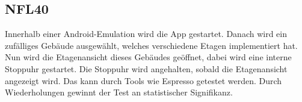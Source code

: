 \subsection*{NFL40}

Innerhalb einer Android-Emulation wird die App gestartet.
Danach wird ein zufälliges Gebäude ausgewählt, welches verschiedene Etagen implementiert hat.
Nun wird die Etagenansicht dieses Gebäudes geöffnet, dabei wird eine interne Stoppuhr gestartet.
Die Stoppuhr wird angehalten, sobald die Etagenansicht angezeigt wird.
Das kann durch Tools wie Espresso getestet werden.
Durch Wiederholungen gewinnt der Test an statistischer Signifikanz.